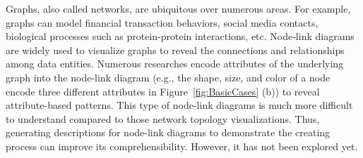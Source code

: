\maketitle

Graphs, also called networks, are ubiquitous over numerous areas. For example, graphs can model financial transaction behaviors, social media contacts, biological processes such as protein-protein interactions, etc.
Node-link diagrams are widely used to visualize graphs to reveal the connections and relationships among data entities.
Numerous researches encode attributes of the underlying graph into the node-link diagram (e.g., the shape, size, and color of a node encode three different attributes in Figure~\ref{fig:BasicCases} (b)) to reveal attribute-based patterns.
This type of node-link diagrams is much more difficult to understand compared to those network topology visualizations. 
Thus, generating descriptions for node-link diagrams to demonstrate the creating process can improve its comprehensibility.
However, it has not been explored yet.

